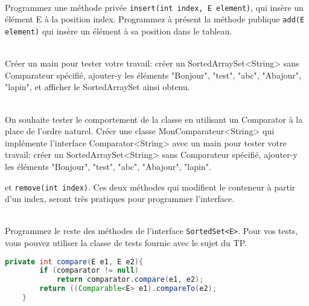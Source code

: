 \documentclass[iutinfo,a4paper,nocorrections,10pt]{ustl-tdtp}
\begin{document}
~\\ \question Programmez une méthode privée \texttt{insert(int index, E element)}, qui insère un élément E à la position index. Programmez à présent la méthode publique \texttt{add(E element)} qui insère un élément à sa position dans le tableau.  

~\\ \question Créer un main pour tester votre travail: créer un SortedArraySet<String> sans Comparateur spécifié, ajouter-y les éléments "Bonjour", "test", "abc", "Abajour", "lapin", et afficher le SortedArraySet ainsi obtenu. 

~\\ \question On souhaite tester le comportement de la classe en utilisant un Comparator à la place de l'ordre naturel. Créer une classe MonComparateur<String> qui implémente l'interface Comparator<String> avec  un main pour tester votre travail: créer un SortedArraySet<String> sans Comparateur spécifié, ajouter-y les éléments "Bonjour", "test", "abc", "Abajour", "lapin". 




et \texttt{remove(int index)}. Ces deux méthodes qui modifient le conteneur à partir d'un index, seront très pratiques pour programmer l'interface.







~\\ \question Programmez le reste des méthodes de l'interface \texttt{SortedSet<E>}. Pour vos tests, vous pouvez utiliser la classe de tests fournie avec le sujet du TP.

\begin{correction}
{\color{red}
\begin{lstlisting}[language=Java]
    private int compare(E e1, E e2){
        if (comparator != null)
            return comparator.compare(e1, e2);
        return ((Comparable<E> e1).compareTo(e2);
    }
\end{lstlisting}
}

\end{correction}
\end{document}
